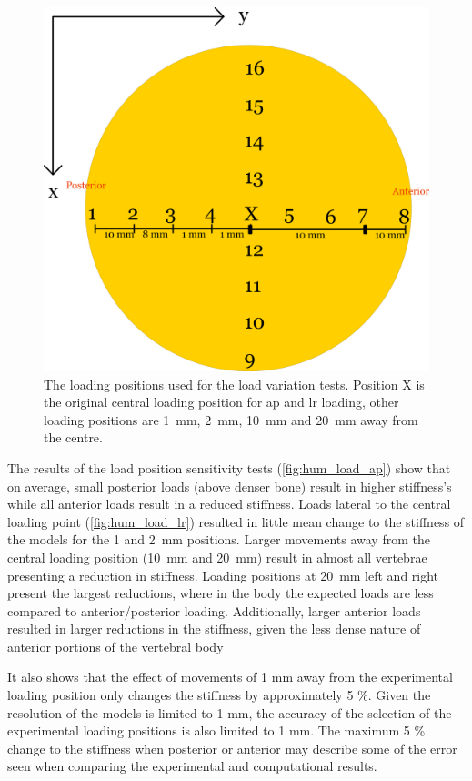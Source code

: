 \begin{figure}[ht!]
\centering
\includegraphics[width=.7\textwidth]{Chapters/Chapter_HT_images/Loading_positions_Human.png}
\caption{The loading positions used for the load variation tests. Position X is the original central loading position for ap and lr loading, other loading positions are 1~mm, 2~mm, 10~mm and 20~mm away from the centre.}
\label{fig:loading_pos}
\end{figure}


The results of the load position sensitivity tests (\cref{fig:hum_load_ap}) show that on average, small posterior loads (above denser bone) result in higher stiffness's while all anterior loads result in a reduced stiffness. Loads lateral to the central loading point (\cref{fig:hum_load_lr}) resulted in little mean change to the stiffness of the models for the 1 and 2~mm positions.
Larger movements away from the central loading position (10~mm and 20~mm) result in almost all vertebrae presenting a reduction in stiffness.
Loading positions at 20~mm left and right present the largest reductions, where in the body the expected loads are less compared to anterior/posterior loading.
Additionally, larger anterior loads resulted in larger reductions in the stiffness, given the less dense nature of anterior portions of the vertebral body

It also shows that the effect of movements of 1 mm away from the experimental loading position only changes the stiffness by approximately 5 \%.
Given the resolution of the models is limited to 1 mm, the accuracy of the selection of the experimental loading positions is also limited to 1 mm.
The maximum 5 \% change to the stiffness when posterior or anterior may describe some of the error seen when comparing the experimental and computational results.

